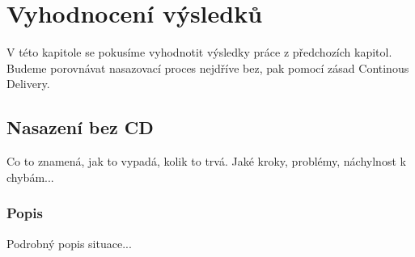 
\chapter{Vyhodnocení výsledků}
\label{ch:vyslekdy}
V této kapitole se pokusíme vyhodnotit výsledky práce z předchozích kapitol. Budeme porovnávat nasazovací proces nejdříve bez, pak pomocí zásad Continous Delivery. 

\section{Nasazení bez CD}
Co to znamená, jak to vypadá, kolik to trvá. Jaké kroky, problémy, náchylnost k chybám...

\subsection{Popis}
Podrobný popis situace...

